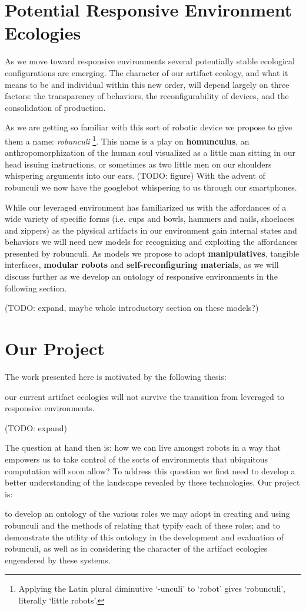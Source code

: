 \section{Potential Responsive Environment Ecologies}
As we move toward responsive environments several potentially stable ecological configurations are emerging. 
The character of our artifact ecology, and what it means to be and individual within this new order, will depend largely on three factors: the transparency of behaviors, the reconfigurability of devices, and the consolidation of production.



As we are getting so familiar with this sort of robotic device we propose to give them a name: \emph{robunculi}%
\footnote{Applying the Latin plural diminutive `-unculi' to `robot' gives `robunculi', literally `little robots'.}.
This name is a play on \textbf{homunculus}, an anthropomorphization of the human soul visualized as a little man sitting in our head issuing instructions, or sometimes as two little men on our shoulders whispering arguments into our ears.
(TODO: figure)
With the advent of robunculi we now have the googlebot whispering to us through our smartphones.

While our leveraged environment has familiarized us with the affordances of a wide variety of specific forms (i.e. cups and bowls, hammers and nails, shoelaces and zippers) as the physical artifacts in our environment gain internal states and behaviors we will need new models for recognizing and exploiting the affordances presented by robunculi. As models we propose to adopt \textbf{manipulatives}, tangible interfaces, \textbf{modular robots} and \textbf{self-reconfiguring materials}, as we will discuss further as we develop an ontology of responsive environments in the following section.

(TODO: expand, maybe whole introductory section on these models?)

\section{Our Project}
%
The work presented here is motivated by the following thesis:
\begin{em}
our current artifact ecologies will not survive the transition from leveraged to responsive environments.
\end{em}

(TODO: expand)

The question at hand then is: how we can live amongst robots in a way that empowers us to take control of the sorts of environments that ubiquitous computation will soon allow? To address this question we first need to develop a better understanding of the landscape revealed by these technologies. Our project is:
\begin{em}
to develop an ontology of the various roles we may adopt in creating and using robunculi and the methods of relating that typify each of these roles; and to demonstrate the utility of this ontology in the development and evaluation of robunculi, as well as in considering the character of the artifact ecologies engendered by these systems.
\end{em}

